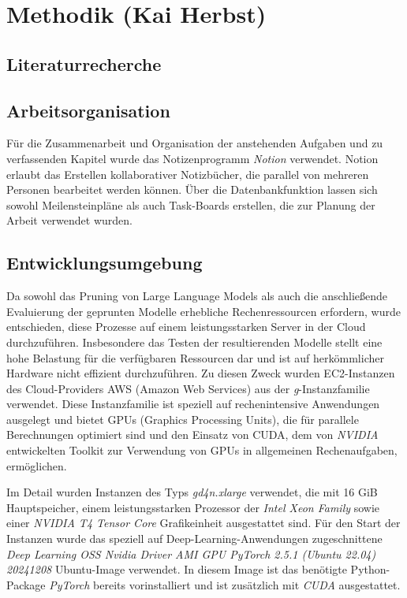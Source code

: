 \section{Methodik (Kai Herbst)}\label{methodik}

\subsection{Literaturrecherche}

\subsection{Arbeitsorganisation}

Für die Zusammenarbeit und Organisation der anstehenden Aufgaben und zu
verfassenden Kapitel wurde das Notizenprogramm \emph{Notion} verwendet. Notion
erlaubt das Erstellen kollaborativer Notizbücher, die parallel von mehreren
Personen bearbeitet werden können. Über die Datenbankfunktion lassen sich sowohl
Meilensteinpläne als auch Task-Boards erstellen, die zur Planung der Arbeit
verwendet wurden.

\subsection{Entwicklungsumgebung}

Da sowohl das Pruning von Large Language Models als auch die anschließende
Evaluierung der geprunten Modelle erhebliche Rechenressourcen erfordern, wurde
entschieden, diese Prozesse auf einem leistungsstarken Server in der Cloud
durchzuführen. Insbesondere das Testen der resultierenden Modelle stellt eine
hohe Belastung für die verfügbaren Ressourcen dar und ist auf herkömmlicher
Hardware nicht effizient durchzuführen. Zu diesen Zweck wurden EC2-Instanzen des
Cloud-Providers AWS (Amazon Web Services) aus der \emph{g}-Instanzfamilie
verwendet. Diese Instanzfamilie ist speziell auf rechenintensive Anwendungen
ausgelegt und bietet GPUs (Graphics Processing Units), die für parallele
Berechnungen optimiert sind und den Einsatz von CUDA, dem von \emph{NVIDIA}
entwickelten Toolkit zur Verwendung von GPUs in allgemeinen Rechenaufgaben,
ermöglichen.

Im Detail wurden Instanzen des Typs \emph{gd4n.xlarge} verwendet, die mit 16 GiB
Hauptspeicher, einem leistungsstarken Prozessor der \emph{Intel Xeon Family}
sowie einer \emph{NVIDIA T4 Tensor Core} Grafikeinheit ausgestattet sind. Für
den Start der Instanzen wurde das speziell auf Deep-Learning-Anwendungen
zugeschnittene \emph{Deep Learning OSS Nvidia Driver AMI GPU PyTorch 2.5.1
	(Ubuntu 22.04) 20241208} Ubuntu-Image verwendet. In diesem Image ist das
benötigte Python-Package \emph{PyTorch} bereits vorinstalliert und ist
zusätzlich mit \emph{CUDA} ausgestattet.

